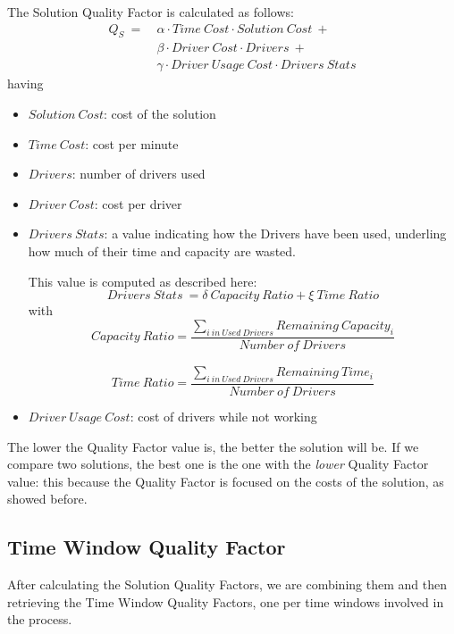 \documentclass[10pt, letterpaper]{article}
\begin{document}
The Solution Quality Factor is calculated as follows:
\begin{equation}
	\begin{aligned}
		Q_{S}\ = &\	\alpha \cdot Time\ Cost \cdot Solution\ Cost\ + \\
				 &\	\beta \cdot Driver\ Cost \cdot Drivers\ + \\
			 	 &\	\gamma \cdot Driver\ Usage\ Cost \cdot Drivers\ Stats
	\end{aligned}
\end{equation}
having
\begin{itemize}
	\item $Solution\ Cost$: cost of the solution
	\item $Time\ Cost$: cost per minute
	\item $Drivers$: number of drivers used
	\item $Driver\ Cost$: cost per driver
	\item $Drivers\ Stats$: a value indicating how the Drivers have been used,
		underling how much of their time and capacity are wasted.

		This value is computed as described here:
		\[Drivers\ Stats\ = \delta\ Capacity\ Ratio + \xi\ Time\ Ratio\]
		with
		\\
		\[Capacity\ Ratio = 
			\frac
				{\sum_{i\ in\ Used\ Drivers} Remaining\ Capacity_{i}}
				{Number\ of\ Drivers}
		\]
		\\
		\[Time\ Ratio =
			\frac
				{\sum_{i\ in\ Used\ Drivers} Remaining\ Time_{i}}
				{Number\ of\ Drivers}
		\]
	\item $Driver\ Usage\ Cost$: cost of drivers while not working
\end{itemize}

The lower the Quality Factor value is, the better the solution will be.
If we compare two solutions, the best one is the one with the \emph{lower}
Quality Factor value: this because the Quality Factor is focused on the costs of
the solution, as showed before.

\subsection{Time Window Quality Factor}
After calculating the Solution Quality Factors, we are combining them and then
retrieving the Time Window Quality Factors, one per time windows involved in the
process.
\end{document}
